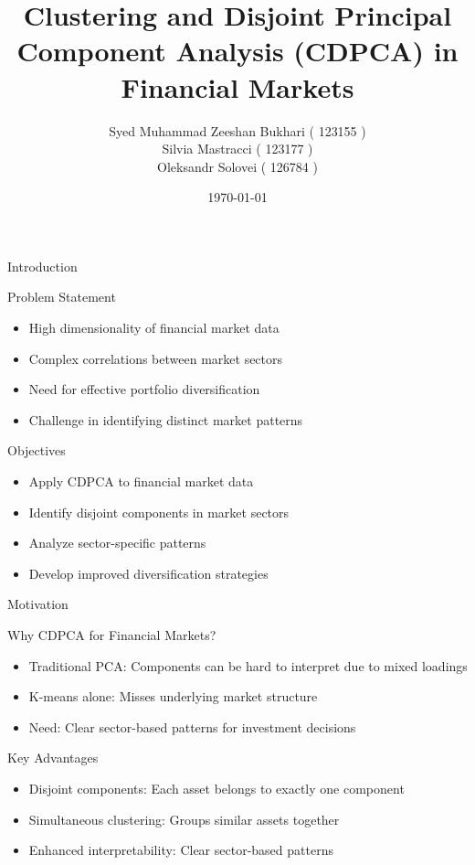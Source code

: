 \documentclass{beamer}
\title{Clustering and Disjoint Principal Component Analysis (CDPCA) in Financial Markets}
\author[123155/123177/126784]{Syed Muhammad Zeeshan Bukhari ( 123155 )\\
Silvia Mastracci ( 123177 )\\
Oleksandr Solovei ( 126784 )
}
\date{\today}
\begin{document}
\begin{frame}
    \titlepage
\end{frame}

\begin{frame}{Introduction}
    \begin{block}{Problem Statement}
        \begin{itemize}
            \item High dimensionality of financial market data
            \item Complex correlations between market sectors
            \item Need for effective portfolio diversification
            \item Challenge in identifying distinct market patterns
        \end{itemize}
    \end{block}

    \begin{block}{Objectives}
        \begin{itemize}
            \item Apply CDPCA to financial market data
            \item Identify disjoint components in market sectors
            \item Analyze sector-specific patterns
            \item Develop improved diversification strategies
        \end{itemize}
    \end{block}
\end{frame}

\begin{frame}{Motivation}
    \begin{block}{Why CDPCA for Financial Markets?}
        \begin{itemize}
            \item Traditional PCA: Components can be hard to interpret due to mixed loadings
            \item K-means alone: Misses underlying market structure
            \item Need: Clear sector-based patterns for investment decisions
        \end{itemize}
    \end{block}

    \begin{block}{Key Advantages}
        \begin{itemize}
            \item Disjoint components: Each asset belongs to exactly one component
            \item Simultaneous clustering: Groups similar assets together
            \item Enhanced interpretability: Clear sector-based patterns
        \end{itemize}
    \end{block}
\end{frame}
\end{document}
